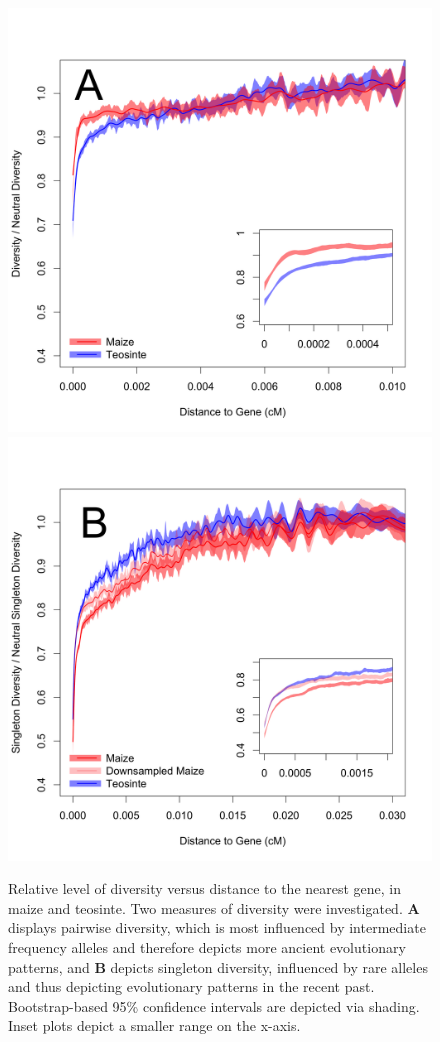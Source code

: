 \documentclass{pnastwo}
\newcommand{\jri}[1]{\textcolor{blue}{\emph{#1}} }
\begin{document}
\begin{article}
\begin{figure}[!htb]
\centering
\includegraphics[width=.45\textwidth]{FigsAndFiles/distanceToGene_WithSignificance_Folded2_manuscript.png} \includegraphics[width=.45\textwidth]{FigsAndFiles/distanceToGene_WithSignificance_Singletons_Downsampled_threeLines_manuscript.png}
\caption{Relative level of diversity versus distance to the nearest
  gene, in maize and teosinte. Two measures of diversity were
  investigated. \textbf{A} displays pairwise
  diversity, which is most influenced by intermediate frequency
  alleles and therefore depicts more ancient evolutionary patterns,
  and \textbf{B} depicts singleton diversity, influenced by rare
  alleles and thus depicting evolutionary patterns in the recent
  past. Bootstrap-based 95\% confidence intervals are depicted via shading. Inset plots depict a smaller range on the x-axis. \label{fig:purify}
  }
\end{figure}



\end{article}
\end{document}

